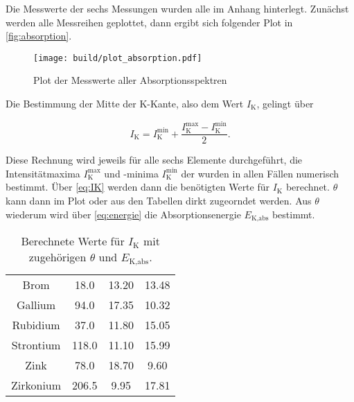 Die Messwerte der sechs Messungen wurden alle im Anhang hinterlegt.
Zunächst werden alle Messreihen geplottet, dann ergibt sich folgender Plot in \autoref{fig:absorption}.

\begin{figure}
    \centering
    \texttt{[image: build/plot\_absorption.pdf]}
    \caption{Plot der Messwerte aller Absorptionsspektren}
    \label{fig:absorption}
\end{figure}

Die Bestimmung der Mitte der K-Kante, also dem Wert $I_\text{K}$, gelingt über 

\begin{equation}
    I_\text{K} = I^\text{min}_\text{K} + \frac{I^\text{max}_\text{K} - I^\text{min}_\text{K}}{2}.
    \label{eq:IK}
\end{equation}

Diese Rechnung wird jeweils für alle sechs Elemente durchgeführt, die Intensitätmaxima $I^{\text{max}}_\text{K}$ und -minima $I^{\text{min}}_\text{K}$ der  wurden in allen Fällen numerisch bestimmt.
Über \eqref{eq:IK} werden dann die benötigten Werte für $I_\text{K}$ berechnet.
$\theta$ kann dann im Plot oder aus den Tabellen dirkt zugeorndet werden.
Aus $\theta$ wiederum wird über \eqref{eq:energie} die Absorptionsenergie $E_\text{K,abs}$ bestimmt.


\begin{table}
    \centering
    \caption{Berechnete Werte für $I_\text{K}$ mit zugehörigen $\theta$ und $E_\text{K,abs}$.}
    \label{tab:IK}
    \begin{tabular}{c S[table-format=3.1] S[table-format=2.2] S[table-format=2.2]}
        \toprule
          &  & \tableSI{\theta}{\degree} & \\
        \midrule
        Brom & 18.0 & 13.20 & 13.48\\
        Gallium & 94.0 & 17.35 & 10.32\\
        Rubidium & 37.0 & 11.80 & 15.05\\
        Strontium & 118.0 & 11.10 & 15.99\\
        Zink & 78.0 & 18.70 & 9.60\\
        Zirkonium & 206.5 & 9.95 & 17.81\\
        \bottomrule
    \end{tabular}
\end{table}

